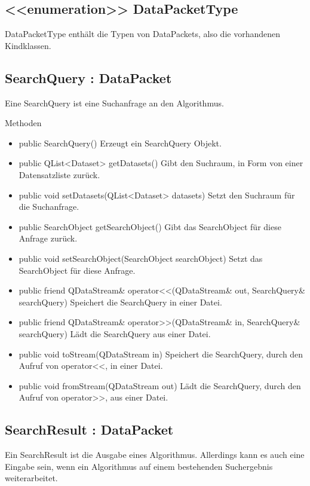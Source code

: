 \subsection*{<<enumeration>> DataPacketType}
DataPacketType enthält die Typen von DataPackets, also die vorhandenen Kindklassen.

\subsection*{SearchQuery : DataPacket}
Eine SearchQuery ist eine Suchanfrage an den Algorithmus.

Methoden
\begin{itemize}
\item public SearchQuery() Erzeugt ein SearchQuery Objekt.
\item public QList<Dataset> getDatasets() Gibt den Suchraum, in Form von einer Datensatzliste zurück.
\item public void setDatasets(QList<Dataset> datasets) Setzt den Suchraum für die Suchanfrage.
\item public SearchObject getSearchObject() Gibt das SearchObject für diese Anfrage zurück.
\item public void setSearchObject(SearchObject searchObject) Setzt das SearchObject für diese Anfrage.
\item public friend QDataStream\& operator<<(QDataStream\& out, SearchQuery\& searchQuery) Speichert die SearchQuery in einer Datei.
\item public friend QDataStream\& operator>>(QDataStream\& in, SearchQuery\& searchQuery) Lädt die SearchQuery aus einer Datei.
\item public void toStream(QDataStream in) Speichert die SearchQuery, durch den Aufruf von operator<<, in einer Datei.
\item public void fromStream(QDataStream out) Lädt die SearchQuery, durch den Aufruf von operator>>, aus einer Datei.
\end{itemize}

\subsection*{SearchResult : DataPacket}
Ein SearchResult ist die Ausgabe eines Algorithmus. Allerdings kann es auch eine Eingabe sein, wenn ein Algorithmus auf einem bestehenden Suchergebnis weiterarbeitet.

